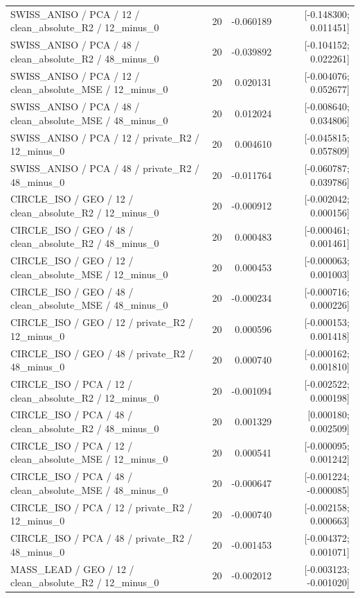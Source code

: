 \begin{longtable}{p{.56\linewidth}rrr}
SWISS\_ANISO / PCA / 12 / clean\_absolute\_R2 / 12\_minus\_0 & 20 & -0.060189 & [-0.148300; 0.011451] \\
SWISS\_ANISO / PCA / 48 / clean\_absolute\_R2 / 48\_minus\_0 & 20 & -0.039892 & [-0.104152; 0.022261] \\
SWISS\_ANISO / PCA / 12 / clean\_absolute\_MSE / 12\_minus\_0 & 20 & 0.020131 & [-0.004076; 0.052677] \\
SWISS\_ANISO / PCA / 48 / clean\_absolute\_MSE / 48\_minus\_0 & 20 & 0.012024 & [-0.008640; 0.034806] \\
SWISS\_ANISO / PCA / 12 / private\_R2 / 12\_minus\_0 & 20 & 0.004610 & [-0.045815; 0.057809] \\
SWISS\_ANISO / PCA / 48 / private\_R2 / 48\_minus\_0 & 20 & -0.011764 & [-0.060787; 0.039786] \\
CIRCLE\_ISO / GEO / 12 / clean\_absolute\_R2 / 12\_minus\_0 & 20 & -0.000912 & [-0.002042; 0.000156] \\
CIRCLE\_ISO / GEO / 48 / clean\_absolute\_R2 / 48\_minus\_0 & 20 & 0.000483 & [-0.000461; 0.001461] \\
CIRCLE\_ISO / GEO / 12 / clean\_absolute\_MSE / 12\_minus\_0 & 20 & 0.000453 & [-0.000063; 0.001003] \\
CIRCLE\_ISO / GEO / 48 / clean\_absolute\_MSE / 48\_minus\_0 & 20 & -0.000234 & [-0.000716; 0.000226] \\
CIRCLE\_ISO / GEO / 12 / private\_R2 / 12\_minus\_0 & 20 & 0.000596 & [-0.000153; 0.001418] \\
CIRCLE\_ISO / GEO / 48 / private\_R2 / 48\_minus\_0 & 20 & 0.000740 & [-0.000162; 0.001810] \\
CIRCLE\_ISO / PCA / 12 / clean\_absolute\_R2 / 12\_minus\_0 & 20 & -0.001094 & [-0.002522; 0.000198] \\
CIRCLE\_ISO / PCA / 48 / clean\_absolute\_R2 / 48\_minus\_0 & 20 & 0.001329 & [0.000180; 0.002509] \\
CIRCLE\_ISO / PCA / 12 / clean\_absolute\_MSE / 12\_minus\_0 & 20 & 0.000541 & [-0.000095; 0.001242] \\
CIRCLE\_ISO / PCA / 48 / clean\_absolute\_MSE / 48\_minus\_0 & 20 & -0.000647 & [-0.001224; -0.000085] \\
CIRCLE\_ISO / PCA / 12 / private\_R2 / 12\_minus\_0 & 20 & -0.000740 & [-0.002158; 0.000663] \\
CIRCLE\_ISO / PCA / 48 / private\_R2 / 48\_minus\_0 & 20 & -0.001453 & [-0.004372; 0.001071] \\
MASS\_LEAD / GEO / 12 / clean\_absolute\_R2 / 12\_minus\_0 & 20 & -0.002012 & [-0.003123; -0.001020] \\

\end{longtable}
